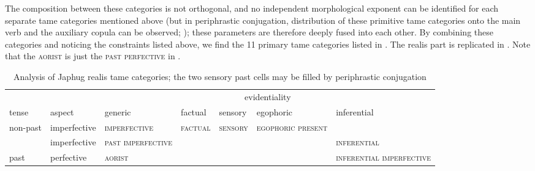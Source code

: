\documentclass[a4paper, oneside, 12pt]{report}
\newcommand*{\citetable}[1]{Table~{#1}}
\newcommand*{\citepage}[1]{p.~{#1}}
\newcommand{\category}[1]{\textsc{#1}}
\begin{document}
The composition between these categories is not orthogonal, 
and no independent morphological exponent can be identified for 
each separate \acs{tame} categories mentioned above
(but in periphrastic conjugation, 
distribution of these primitive \acs{tame} categories 
onto the main verb and the auxiliary copula 
can be observed; \citealt[\citepage{1089}, (7)]{jacques2021grammar});
these parameters are therefore deeply fused into each other.
By combining these categories and noticing the constraints listed above, 
we find the 11 primary \acs{tame} categories 
listed in \citet[\citepage{21.1}]{jacques2021grammar}.
The realis part is replicated in .
Note that the \category{aorist} is just the \category{past perfective} in
\citet[\citetable{31.4}]{jacques2015sketch}.
 
\begin{table}[H]
    \centering
    \caption{Analysis of Japhug realis \acs{tame} categories;
    the two sensory past cells may be filled by periphrastic conjugation}
    \label{tbl:realis-tam}
    \scriptsize
    \begin{tabular}{@{}lllllll@{}}
        \toprule
                                &                          & \multicolumn{5}{c}{evidentiality}                                                                                                                                                                        \\ \cmidrule(l){3-7} 
        \multirow{-2}{*}{tense} & \multirow{-2}{*}{aspect} & generic                           & factual                           & sensory                           & egophoric                         & inferential                                              \\ \midrule
        non-past                & imperfective             & \category{imperfective}             & \category{factual}                  & \category{sensory}                  & \category{egophoric present}        & \cellcolor[HTML]{C0C0C0}{\color[HTML]{C0C0C0} \category{}} \\ \midrule
                                & imperfective             & \category{past imperfective}        & \cellcolor[HTML]{C0C0C0}\category{} & \cellcolor[HTML]{C0C0C0}\category{} & \cellcolor[HTML]{C0C0C0}\category{} & \category{inferential}                                     \\ \cmidrule(l){2-7} 
        \multirow{-2}{*}{past}  & perfective               & \category{aorist} & \cellcolor[HTML]{C0C0C0}\category{} & \cellcolor[HTML]{C0C0C0}\category{} & \cellcolor[HTML]{C0C0C0}\category{} & \category{inferential imperfective}                        \\ \bottomrule
    \end{tabular}
\end{table}
\end{document}
